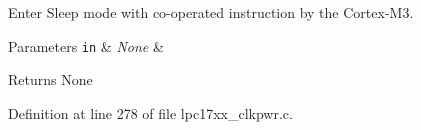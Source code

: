 \-Enter \-Sleep mode with co-\/operated instruction by the \-Cortex-\/\-M3. 


\begin{DoxyParams}[1]{\-Parameters}
\mbox{\tt in}  & {\em \-None} & \\
\hline
\end{DoxyParams}
\begin{DoxyReturn}{\-Returns}
\-None 
\end{DoxyReturn}


\-Definition at line 278 of file lpc17xx\-\_\-clkpwr.\-c.

